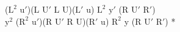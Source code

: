 ($\text{L}^2$ $\text{u}'$)(L $\text{U}'$ L U)($\text{L}'$ u) $\text{L}^2$ $\text{y}'$ (R $\text{U}'$ $\text{R}'$)\\
$\text{y}^2$ ($\text{R}^2$ $\text{u}'$)(R $\text{U}'$ R U)($\text{R}'$ u) $\text{R}^2$ y (R $\text{U}'$ $\text{R}'$) *\\
